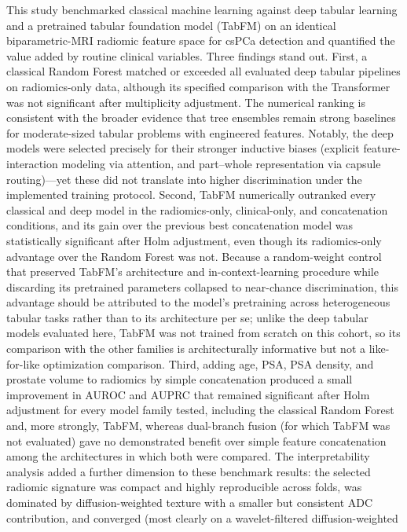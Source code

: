 \documentclass[11pt]{article}
\begin{document}
This study benchmarked classical machine learning against deep tabular learning
and a pretrained tabular foundation model (TabFM) on an identical
biparametric-MRI radiomic feature space for csPCa detection and quantified the
value added by routine clinical variables. Three findings stand out. First, a
classical Random Forest matched or exceeded all evaluated deep tabular
pipelines on radiomics-only data, although its specified comparison with the
Transformer was not significant after multiplicity adjustment. The numerical
ranking is consistent with the broader evidence that tree ensembles remain
strong baselines for moderate-sized tabular problems with engineered features.
Notably, the deep models were selected precisely for their stronger inductive
biases (explicit feature-interaction modeling via attention, and part--whole
representation via capsule routing)---yet these did not translate into higher
discrimination under the implemented training protocol. Second, TabFM
numerically outranked every classical and deep model in the radiomics-only,
clinical-only, and concatenation conditions, and its gain over the previous
best concatenation model was statistically significant after Holm adjustment,
even though its radiomics-only advantage over the Random Forest was not.
Because a random-weight control that preserved TabFM's architecture and
in-context-learning procedure while discarding its pretrained parameters
collapsed to near-chance discrimination, this advantage should be attributed to
the model's pretraining across heterogeneous tabular tasks rather than to its
architecture per se; unlike the deep tabular models evaluated here, TabFM was
not trained from scratch on this cohort, so its comparison with the other
families is architecturally informative but not a like-for-like optimization
comparison. Third, adding age, PSA,
PSA density, and prostate volume
to radiomics by simple concatenation produced a small improvement in AUROC and
AUPRC that remained significant after Holm adjustment for every model family
tested, including the classical Random Forest and, more strongly, TabFM,
whereas dual-branch fusion (for which TabFM was not evaluated) gave no
demonstrated benefit over simple feature concatenation among the architectures
in which both were compared. The interpretability analysis added a further
dimension to these benchmark results: the
selected radiomic signature was compact and highly reproducible across folds, was
dominated by diffusion-weighted texture with a smaller but consistent ADC
contribution, and converged (most clearly on a wavelet-filtered diffusion-weighted
\end{document}
